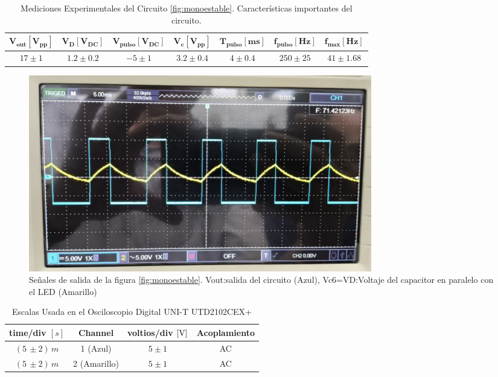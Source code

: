             \begin{table}[H]
              \centering
              \begin{tabular}{|c|c|c|c|c|c|c|}
                \hline
                $\mathbf{V_{out} [V_{pp}]}$ & $\mathbf{V_D [V_{DC}]}$ & $\mathbf{V_{pulso} [V_{DC}]}$ & $\mathbf{V_c [V_{pp}]}$ & $\mathbf{T_{pulso} [ms]}$ & $\mathbf{f_{pulso} [Hz]}$ & $\mathbf{f_{max} [Hz]}$ \\
                \hline
                $17 \pm 1$ & $1.2 \pm 0.2$ & $-5 \pm 1$ & $3.2 \pm 0.4$ & $4 \pm 0.4$ & $250 \pm 25$ & $41 \pm 1.68$ \\
                \hline
              \end{tabular}
              \caption{Mediciones Experimentales del Circuito \ref{fig:monoestable}. Características importantes del circuito.}
              \label{tab:exp_monoestable}
            \end{table}

            

            
            \begin{figure}[H]
                \centering
                \renewcommand{\figurename}{Imagen}
                \includegraphics[width=15cm]{Imagenes/exp_monoestable_vc_vout.png}
                \caption{Señales de salida de la figura \ref{fig:monoestable}. Vout:salida del circuito (Azul), Vc6=VD:Voltaje del capacitor en paralelo con el LED (Amarillo)}
                \label{fig:exp_monoestable_vc_vout}
            \end{figure}

            \begin{table}[H]
                \centering
                \begin{tabular}{|c|c|c|c|}
                    \hline
                    \textbf{time/div} $[s]$ & \textbf{Channel} & \textbf{voltios/div $[\volt]$} & \textbf{Acoplamiento} \\ \hline
                    $(5 \, \pm 2) \, m  $ & 1 (Azul)  &   $5 \pm 1   $ & AC \\ \hline  
                    $(5 \, \pm 2) \, m  $ & 2 (Amarillo)  &   $5 \pm 1   $ & AC \\ \hline  
                \end{tabular}
                \caption{Escalas Usada en el Osciloscopio Digital UNI-T UTD2102CEX+}
                \label{tab:escala_monoestable_vc_vout}
            \end{table}

